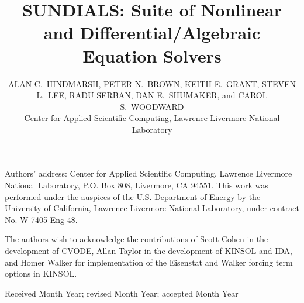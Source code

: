\documentclass[acmtoms]{acmtrans2m}
\title{SUNDIALS: Suite of Nonlinear and Differential/Algebraic Equation Solvers}
\author{ALAN C.~HINDMARSH, PETER N.~BROWN, KEITH E.~GRANT,  
  STEVEN L.~LEE, RADU SERBAN, DAN E.~SHUMAKER, and CAROL S.~WOODWARD \\
  Center for Applied Scientific Computing,
  Lawrence Livermore National Laboratory}
\begin{document}
\setcounter{page}{1}

\begin{bottomstuff}
Authors' address: Center for Applied Scientific Computing, 
Lawrence Livermore National Laboratory, P.O. Box 808,
Livermore, CA 94551.\newline
This work was performed under the auspices of the
U.S. Department of Energy by the University of California,
Lawrence Livermore National Laboratory, under contract No.
W-7405-Eng-48.
\end{bottomstuff}

\maketitle




   
   
   








\begin{acks}
The authors wish to acknowledge the contributions of Scott Cohen
in the development of CVODE, Allan Taylor in the development of
KINSOL and IDA, and Homer Walker for implementation of the
Eisenstat and Walker forcing term options in KINSOL.

\end{acks}





\begin{received}
Received Month Year;
revised Month Year; accepted Month Year
\end{received}
\end{document}
